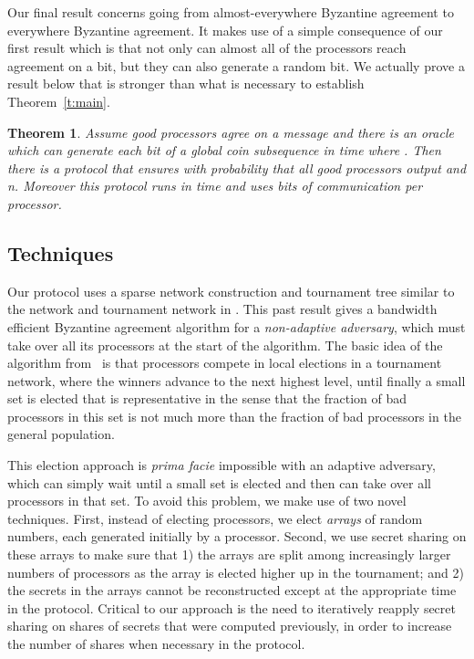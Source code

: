 \documentclass[letterpaper,11pt]{article}
\newtheorem{theorem}{Theorem}
\begin{document}
Our final result concerns going from almost-everywhere Byzantine agreement to everywhere Byzantine agreement.  It makes use of a simple consequence of our first result which is that not only can almost all of the processors reach agreement on a bit, but they can also generate a random bit.  We actually prove a result below that is stronger than what is necessary to establish Theorem~\ref{t:main}.

\begin{theorem}\label{t:ae2e}
Assume  good processors agree on a message  and there is an oracle which can generate each bit of a global coin subsequence  in  time where . Then  there is a protocol that ensures with probability   that all good processors output  and n.  Moreover this protocol runs in  time and uses  bits of communication per processor.
\end{theorem} 


\subsection{Techniques}

Our protocol uses a sparse network construction and tournament tree similar to the network and tournament network in \cite{KSSV}.  This past result gives a bandwidth efficient Byzantine agreement algorithm for a \emph{non-adaptive adversary},  which must take over all its processors at the start of the algorithm.  The basic idea of the algorithm from~\cite{KSSV} is that processors compete in local elections in a tournament network, where the winners advance to the next highest level, until finally a small set is elected that is representative in the sense that the fraction of bad processors in this set is not much more than the fraction of bad processors in the general population.

This election approach is \emph{prima facie} impossible with an adaptive adversary, which can simply wait until a small set is elected and then can take over all processors in that set.  To avoid this problem, we make use of two novel techniques.  First, instead of electing processors, we elect \emph{arrays} of random numbers, each generated initially by a processor.  Second, we use secret sharing on these arrays to make sure that 1) the arrays are split among increasingly larger numbers of processors as the array is elected higher up in the tournament; and 2) the secrets in the arrays cannot be reconstructed except at the appropriate time in the protocol.  Critical to our approach is the need to iteratively reapply secret sharing on shares of secrets that were computed previously, in order to increase the number of shares when necessary in the protocol.
\end{document}
